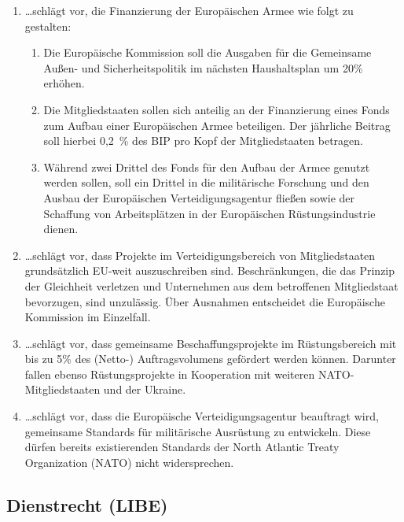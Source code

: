 \documentclass[12pt,a4paper]{article}
\begin{document}
\begin{enumerate}[leftmargin=2em, start=4, itemsep=10pt]
    \item \ldots schlägt vor, die Finanzierung der Europäischen Armee wie folgt zu gestalten:
    \begin{enumerate}[label=\alph*), leftmargin=1.5em, itemsep=6pt]
        \item Die Europäische Kommission soll die Ausgaben für die Gemeinsame Außen- und Sicherheitspolitik im nächsten Haushaltsplan um 20\% erhöhen.

        \item Die Mitgliedstaaten sollen sich anteilig an der Finanzierung eines Fonds zum Aufbau einer Europäischen Armee beteiligen. Der jährliche Beitrag soll hierbei 0,2~\% des BIP pro Kopf der Mitgliedstaaten betragen.

        \item Während zwei Drittel des Fonds für den Aufbau der Armee genutzt werden sollen, soll ein Drittel in die militärische Forschung und den Ausbau der Europäischen Verteidigungsagentur fließen sowie der Schaffung von Arbeitsplätzen in der Europäischen Rüstungsindustrie dienen.
    \end{enumerate}

    \item \ldots schlägt vor, dass Projekte im Verteidigungsbereich von Mitgliedstaaten grundsätzlich EU-weit auszuschreiben sind. Beschränkungen, die das Prinzip der Gleichheit verletzen und Unternehmen aus dem betroffenen Mitgliedstaat bevorzugen, sind unzulässig. Über Ausnahmen entscheidet die Europäische Kommission im Einzelfall.

    \item \ldots schlägt vor, dass gemeinsame Beschaffungsprojekte im Rüstungsbereich mit bis zu 5\% des (Netto-) Auftragsvolumens gefördert werden können. Darunter fallen ebenso Rüstungsprojekte in Kooperation mit weiteren NATO-Mitgliedstaaten und der Ukraine.

    \item \ldots schlägt vor, dass die Europäische Verteidigungsagentur beauftragt wird, gemeinsame Standards für militärische Ausrüstung zu entwickeln. Diese dürfen bereits existierenden Standards der North Atlantic Treaty Organization (NATO) nicht widersprechen.
\end{enumerate}

\subsection*{Dienstrecht (LIBE)}
\end{document}
